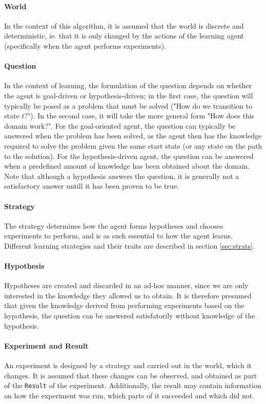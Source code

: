 \documentclass[master.tex]{subfiles}
\begin{document}
\paragraph*{World}
In the context of this algorithm, it is assumed that the world is discrete and deterministic, ie. that it is only changed by the actions of the learning agent (specifically when the agent performs experiments).

\paragraph*{Question}
In the context of learning, the formulation of the question depends on whether the agent is goal-driven or hypothesis-driven; in the first case, the question will typically be posed as a problem that must be solved ("How do we transition to state $t$?"). In the second case, it will take the more general form "How does this domain work?".
For the goal-oriented agent, the question can typically be answered when the problem has been solved, as the agent then has the knowledge required to solve the problem given the same start state (or any state on the path to the solution). For the hypothesis-driven agent, the question can be answered when a predefined amount of knowledge has been obtained about the domain. Note that although a hypothesis answers the question, it is generally not a satisfactory answer untill it has been proven to be true.

\paragraph*{Strategy}
The strategy determines how the agent forms hypotheses and chooses experiments to perform, and is as such essential to how the agent learns. Different learning strategies and their traits are described in section \ref{sec:strats}.

\paragraph*{Hypothesis}
Hypotheses are created and discarded in an ad-hoc manner, since we are only interested in the knowledge they allowed us to obtain. It is therefore presumed that given the knowledge derived from performing experiments based on the hypothesis, the question can be answered satisfatorily without knowledge of the hypothesis.

\paragraph*{Experiment and Result}
An experiment is designed by a strategy and carried out in the world, which it changes. It is assumed that these changes can be observed, and obtained as part of the \texttt{Result} of the experiment. Additionally, the result may contain information on how the experiment was run, which parts of it succeeded and which did not.
\end{document}
